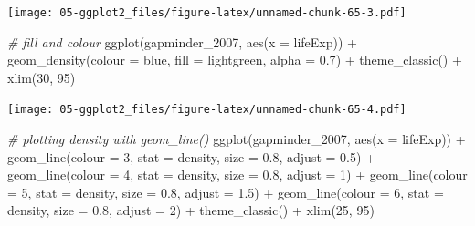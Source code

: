 \documentclass[
]{book}
\newenvironment{Shaded}{\begin{snugshade}}{\end{snugshade}}
\newcommand{\AttributeTok}[1]{\textcolor[rgb]{0.77,0.63,0.00}{#1}}
\newcommand{\CommentTok}[1]{\textcolor[rgb]{0.56,0.35,0.01}{\textit{#1}}}
\newcommand{\DecValTok}[1]{\textcolor[rgb]{0.00,0.00,0.81}{#1}}
\newcommand{\FloatTok}[1]{\textcolor[rgb]{0.00,0.00,0.81}{#1}}
\newcommand{\FunctionTok}[1]{\textcolor[rgb]{0.00,0.00,0.00}{#1}}
\newcommand{\NormalTok}[1]{#1}
\newcommand{\SpecialCharTok}[1]{\textcolor[rgb]{0.00,0.00,0.00}{#1}}
\newcommand{\StringTok}[1]{\textcolor[rgb]{0.31,0.60,0.02}{#1}}
\begin{document}
\texttt{[image: 05-ggplot2\_files/figure-latex/unnamed-chunk-65-3.pdf]}

\begin{Shaded}
\begin{Highlighting}[]


\CommentTok{\# fill and colour}
\FunctionTok{ggplot}\NormalTok{(gapminder\_2007, }\FunctionTok{aes}\NormalTok{(}\AttributeTok{x =}\NormalTok{ lifeExp)) }\SpecialCharTok{+} 
   \FunctionTok{geom\_density}\NormalTok{(}\AttributeTok{colour =} \StringTok{\textquotesingle{}blue\textquotesingle{}}\NormalTok{, }\AttributeTok{fill =} \StringTok{\textquotesingle{}lightgreen\textquotesingle{}}\NormalTok{, }\AttributeTok{alpha =} \FloatTok{0.7}\NormalTok{) }\SpecialCharTok{+}
   \FunctionTok{theme\_classic}\NormalTok{() }\SpecialCharTok{+}
   \FunctionTok{xlim}\NormalTok{(}\DecValTok{30}\NormalTok{, }\DecValTok{95}\NormalTok{)}
\end{Highlighting}
\end{Shaded}

\texttt{[image: 05-ggplot2\_files/figure-latex/unnamed-chunk-65-4.pdf]}

\begin{Shaded}
\begin{Highlighting}[]


\CommentTok{\# plotting density with geom\_line()}
\FunctionTok{ggplot}\NormalTok{(gapminder\_2007, }\FunctionTok{aes}\NormalTok{(}\AttributeTok{x =}\NormalTok{ lifeExp)) }\SpecialCharTok{+} 
   \FunctionTok{geom\_line}\NormalTok{(}\AttributeTok{colour =} \DecValTok{3}\NormalTok{, }\AttributeTok{stat =} \StringTok{\textquotesingle{}density\textquotesingle{}}\NormalTok{, }\AttributeTok{size =} \FloatTok{0.8}\NormalTok{, }\AttributeTok{adjust =} \FloatTok{0.5}\NormalTok{) }\SpecialCharTok{+}
   \FunctionTok{geom\_line}\NormalTok{(}\AttributeTok{colour =} \DecValTok{4}\NormalTok{, }\AttributeTok{stat =} \StringTok{\textquotesingle{}density\textquotesingle{}}\NormalTok{, }\AttributeTok{size =} \FloatTok{0.8}\NormalTok{, }\AttributeTok{adjust =} \DecValTok{1}\NormalTok{) }\SpecialCharTok{+}
   \FunctionTok{geom\_line}\NormalTok{(}\AttributeTok{colour =} \DecValTok{5}\NormalTok{, }\AttributeTok{stat =} \StringTok{\textquotesingle{}density\textquotesingle{}}\NormalTok{, }\AttributeTok{size =} \FloatTok{0.8}\NormalTok{, }\AttributeTok{adjust =} \FloatTok{1.5}\NormalTok{) }\SpecialCharTok{+}
   \FunctionTok{geom\_line}\NormalTok{(}\AttributeTok{colour =} \DecValTok{6}\NormalTok{, }\AttributeTok{stat =} \StringTok{\textquotesingle{}density\textquotesingle{}}\NormalTok{, }\AttributeTok{size =} \FloatTok{0.8}\NormalTok{, }\AttributeTok{adjust =} \DecValTok{2}\NormalTok{) }\SpecialCharTok{+}
   \FunctionTok{theme\_classic}\NormalTok{() }\SpecialCharTok{+}
   \FunctionTok{xlim}\NormalTok{(}\DecValTok{25}\NormalTok{, }\DecValTok{95}\NormalTok{)}
\end{Highlighting}
\end{Shaded}
\end{document}
